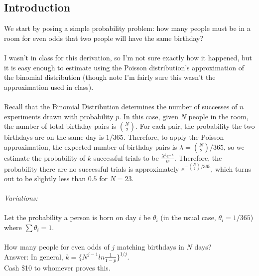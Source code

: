 \documentclass[12pt]{article}
\begin{document}
\subsection{Introduction}
We start by posing a simple probability problem: how many people must be in a room for even odds that two people will have the same birthday?
\\ \\
I wasn't in class for this derivation, so I'm not sure exactly how it happened, but it is easy enough to estimate using the Poisson distribution's approximation of the binomial distribution (though note I'm fairly sure this wasn't the approximation used in class).
\\ \\
Recall that the Binomial Distribution determines the number of successes of $n$ experiments drawn with probability $p$.  In this case, given $N$ people in the room, the number of total birthday pairs is ${N \choose 2}$.  For each pair, the probability the two birthdays are on the same day is $1/365$.  Therefore, to apply the Poisson approximation, the expected number of birthday pairs is $\lambda = {N \choose 2}/365$, so we estimate the probability of $k$ successful trials to be $\frac{\lambda^k e^{-\lambda}}{k!}$.  Therefore, the probability there are no successful trials is approximately $e^{-{N \choose 2}/365}$, which turns out to be slightly less than $0.5$ for $N = 23$.
\\ \\
{\it Variations:}\\ \\
Let the probability a person is born on day $i$ be $\theta_i$ (in the usual case, $\theta_i = 1/365$) where $\sum \theta_i = 1$.
\\ \\
How many people for even odds of $j$ matching birthdays in $N$ days? \\
Answer: In general, $k = \{ N^{j-1} ln \frac{1}{1-p} \}^{1/j}$.\\
Cash \$10 to whomever proves this.
\\ \\
\end{document}
